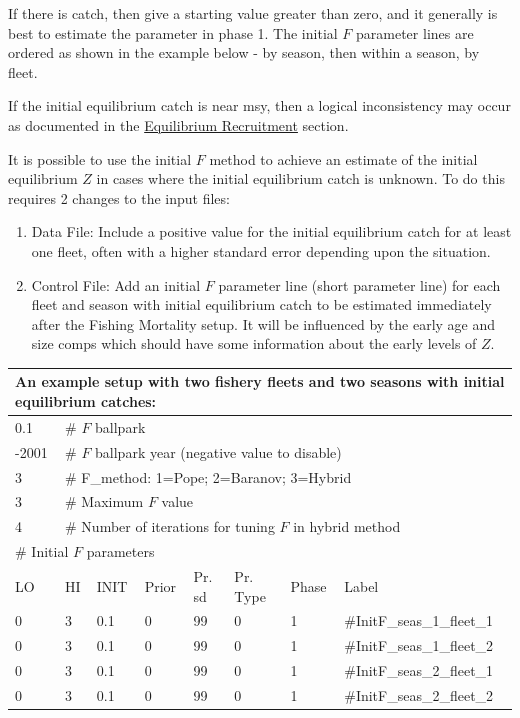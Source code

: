 If there is catch, then give a starting value greater than zero, and it generally is best to estimate the parameter in phase 1. The initial $F$ parameter lines are ordered as shown in the example below - by season, then within a season, by fleet.

If the initial equilibrium catch is near \gls{msy}, then a logical inconsistency may occur as documented in the \hyperlink{EquilRecr}{Equilibrium Recruitment} section. 

It is possible to use the initial $F$ method to achieve an estimate of the initial equilibrium $Z$ in cases where the initial equilibrium catch is unknown. To do this requires 2 changes to the input files:
\begin{enumerate}
	\item Data File: Include a positive value for the initial equilibrium catch for at least one fleet, often with a higher standard error depending upon the situation.
	\item Control File: Add an initial $F$ parameter line (short parameter line) for each fleet and season with initial equilibrium catch to be estimated immediately after the Fishing Mortality setup. It will be influenced by the early age and size comps which should have some information about the early levels of $Z$.
\end{enumerate}

\begin{longtable}{p{1.3cm} p{1cm} p{1cm} p{1cm} p{1.5cm} p{1.2cm} p{1cm} p{2.5cm}}
	\multicolumn{8}{l}{An example setup with two fishery fleets and two seasons with initial equilibrium catches:} \\
	\hline
	0.1 & \multicolumn{7}{l}{\# $F$ ballpark} \Tstrut\Bstrut\\
	\hline
	-2001 & \multicolumn{7}{l}{\# $F$ ballpark year (negative value to disable)} \Tstrut\Bstrut\\
	\hline
	3 & \multicolumn{7}{l}{\# F\_method: 1=Pope; 2=Baranov; 3=Hybrid} \Tstrut\Bstrut\\
	\hline
	3 & \multicolumn{7}{l}{\# Maximum $F$ value} \Tstrut\Bstrut\\
	\hline
	4 & \multicolumn{7}{l}{\# Number of iterations for tuning $F$ in hybrid method} \Tstrut\Bstrut\\
	\hline
	\multicolumn{8}{l}{\# Initial $F$ parameters} \Tstrut\Bstrut\\
	LO & HI & INIT & Prior & Pr. \gls{sd} & Pr. Type & Phase & Label \Bstrut\\
	\hline
	0 & 3 & 0.1 & 0 & 99 & 0 & 1 & \#InitF\_seas\_1\_fleet\_1 \Tstrut\\
	\hline
	0 & 3 & 0.1 & 0 & 99 & 0 & 1 & \#InitF\_seas\_1\_fleet\_2 \Tstrut\\
	\hline
	0 & 3 & 0.1 & 0 & 99 & 0 & 1 & \#InitF\_seas\_2\_fleet\_1 \Tstrut\\
	\hline
	0 & 3 & 0.1 & 0 & 99 & 0 & 1 & \#InitF\_seas\_2\_fleet\_2 \Tstrut\\
	\hline
\end{longtable}


